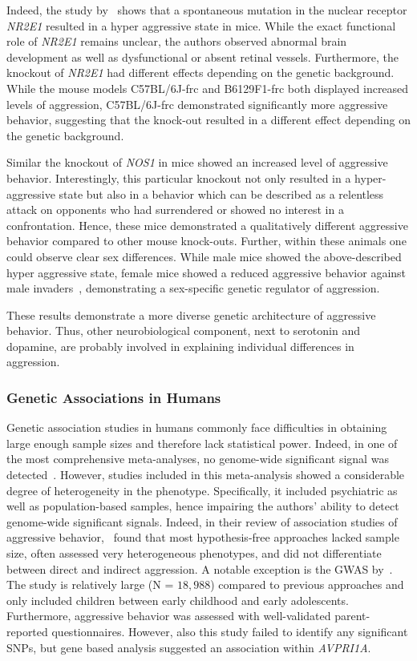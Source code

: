 Indeed, the study by~\cite{Young2002} shows that a spontaneous mutation in the nuclear receptor \textit{NR2E1} resulted in a hyper aggressive state in mice.
While the exact functional role of \textit{NR2E1} remains unclear, the authors observed abnormal brain development as well as dysfunctional or absent retinal vessels.
Furthermore, the knockout of \textit{NR2E1} had different effects depending on the genetic background.
While the mouse models C57BL/6J-frc and B6129F1-frc both displayed increased levels of aggression, C57BL/6J-frc demonstrated significantly more aggressive behavior,
 suggesting that the knock-out resulted in a different effect depending on the genetic background.

Similar the knockout of \textit{NOS1} in mice showed an increased level of aggressive behavior.
Interestingly, this particular knockout not only resulted in a hyper-aggressive state but also in a behavior which can be described as a relentless attack on opponents who had surrendered or showed no interest in a confrontation.
Hence, these mice demonstrated a qualitatively different aggressive behavior compared to other mouse knock-outs.
Further, within these animals one could observe clear sex differences.
While male mice showed the above-described hyper aggressive state, female mice showed a reduced aggressive behavior against male invaders~\cite{Gammie1999,Nelson1995}, demonstrating a sex-specific genetic regulator of aggression.

These results demonstrate a more diverse genetic architecture of aggressive behavior.
Thus, other neurobiological component, next to serotonin and dopamine, are probably involved in explaining individual differences in aggression.

\subsubsection{Genetic Associations in Humans}
\label{ssub:genetic_associations_in_humans}

Genetic association studies in humans commonly face difficulties in obtaining large enough sample sizes and therefore lack statistical power.
Indeed, in one of the most comprehensive meta-analyses, no genome-wide significant signal was detected~\citet{Vassos2014}.
However, studies included in this meta-analysis showed a considerable degree of heterogeneity in the phenotype.
Specifically, it included psychiatric as well as population-based samples, hence impairing the authors' ability to detect genome-wide significant signals.
Indeed, in their review of association studies of aggressive behavior,~\citet{Fernandez-Castillo2016} found that most hypothesis-free approaches lacked sample size, often assessed very heterogeneous phenotypes, and did not differentiate between direct and indirect aggression. 
A notable exception is the GWAS by~\citet{Pappa2016a}.
The study is relatively large (N = $18,988$) compared to previous approaches and only included children between early childhood and early adolescents.
Furthermore, aggressive behavior was assessed with well-validated parent-reported questionnaires. 
However, also this study failed to identify any significant SNPs, but gene based analysis suggested an association within \textit{AVPRI1A}.

